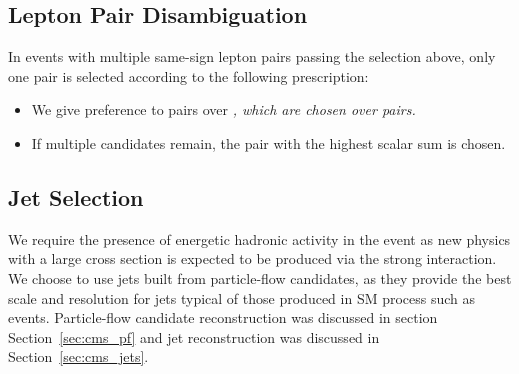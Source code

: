 \subsection{Lepton Pair Disambiguation}
\label{sec:evtsel_pair}
In events with multiple same-sign lepton pairs passing the selection above,
only one pair is selected according to the following prescription:
\begin{itemize}
\item We give preference to \mm pairs over \em, which are chosen over \ee pairs.
\item If multiple candidates remain, the pair with the highest scalar sum \pt is chosen.  
\end{itemize}

\subsection{Jet Selection}
\label{sec:evtsel_jets}
We require the presence of energetic hadronic activity in the event as new
physics with a large cross section is expected to be produced via the strong
interaction. We choose to use jets built from particle-flow candidates, as
they provide the best scale and resolution for jets typical of those produced
in SM process such as \ttbar events. Particle-flow candidate reconstruction
was discussed in section Section~\ref{sec:cms_pf} and jet reconstruction was
discussed in Section~\ref{sec:cms_jets}.

